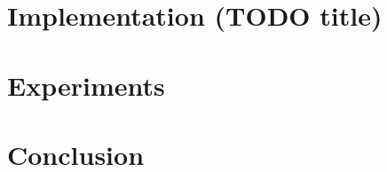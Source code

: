 \documentclass{template/EPL-master-thesis-covers-EN}
\begin{document}
  
  
  
  

  \chapter{Implementation (TODO title)}
  \label{chapter:implementation}
  


  \chapter{Experiments}
  \label{chapter:experiments}

  \chapter{Conclusion}
  \label{chapter:conclusion}

   
  

  \backcoverpage
\end{document}
